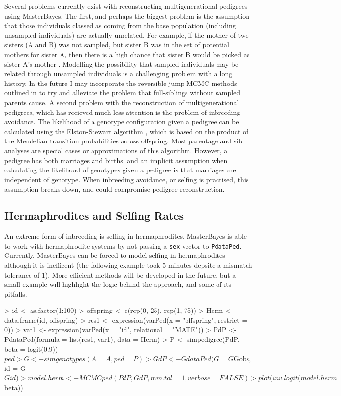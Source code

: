 \documentclass{article}
\begin{document}
Several problems currently exist with reconstructing multigenerational pedigrees using MasterBayes.  The first, and perhaps the biggest problem is the assumption that those individuals classed as coming from the base population (including unsampled individuals) are actually unrelated.  For example, if the mother of two sisters (A and B) was not sampled, but sister B was in the set of potential mothers for sister A, then there is a high chance that sister B would be picked as sister A's mother \citep{Thompson.1976a}.  Modelling the possibility that sampled individuals may be related through unsampled individuals is a challenging problem with a long history. In the future I may incorporate the reversible jump MCMC methods outlined in \citet{Emery.2001} to try and alleviate the problem that full-siblings without sampled parents cause.  A second problem with the reconstruction of multigenerational pedigrees, which has recieved much less attention is the problem of inbreeding avoidance.  The likelihood of a genotype configuration given a pedigree can be calculated using the Elston-Stewart algorithm \citep{Elston.1971}, which is based on the product of the Mendelian transition probabilities across offspring.  Most parentage and sib analyses are special cases or approximations of this algorithm.  However, a pedigree has both marriages and births, and an implicit assumption when calculating the likelihood of genotypes given a pedigree is that marriages are independent of genotype. When inbreeding avoidance, or selfing is practised, this assumption breaks down, and could compromise pedigree reconstruction. 

\subsection{Hermaphrodites and Selfing Rates}
\label{Herm-sec}

An extreme form of inbreeding is selfing in hermaphrodites.  MasterBayes is able to work with hermaphrodite systems by not passing a \texttt{sex} vector to \texttt{PdataPed}.  Currently, MasterBayes can be forced to model selfing in hermaphrodites although it is inefficent (the following example took 5 minutes depsite a mismatch tolerance of 1).  More efficient methods will be developed in the future, but a small example will highlight the logic behind the approach, and some of its pitfalls.

\begin{Schunk}
\begin{Sinput}
> id <- as.factor(1:100)
> offspring <- c(rep(0, 25), rep(1, 75))
> Herm <- data.frame(id, offspring)
> res1 <- expression(varPed(x = "offspring", restrict = 0))
> var1 <- expression(varPed(x = "id", relational = "MATE"))
> PdP <- PdataPed(formula = list(res1, var1), data = Herm)
> P <- simpedigree(PdP, beta = logit(0.9))$ped
> G <- simgenotypes(A = A, ped = P)
> GdP <- GdataPed(G = G$Gobs, id = G$Gid)
> model.herm <- MCMCped(PdP, GdP, mm.tol = 1, verbose = FALSE)
> plot(inv.logit(model.herm$beta))
\end{Sinput}
\end{Schunk}
\end{document}
